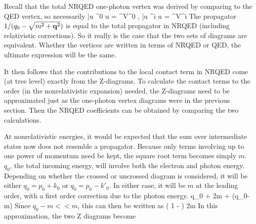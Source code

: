 Recall that the total NRQED one-photon vertex was derived by comparing to the QED vertex, so necessarily
\beq
	\bar{u} \Gamma^0 u = \phi^\dagger V^0 \phi , \;  \bar{u} \Gamma^i u = \phi^\dagger V^i \phi
\eeq 
The propagator $1/(q_0 - \sqrt{m^2 + \mathbf{q}^2})$ is equal to the total propagator in NRQED (including relativistic corrections).  So it really is the case that the two sets of diagrams are equivalent.  Whether the vertices are written in terms of NRQED or QED, the ultimate expression will be the same.

It then follows that the contributions to the local contact term in NRQED come (at tree level) exactly from the Z-diagrams.  To calculate the contact terms to the order (in the nonrelativistic expansion) needed, the Z-diagrams need to be approximated just as the one-photon vertex diagrams were in the previous section.  Then the NRQED coefficients can be obtained by comparing the two calculations.  

At nonrelativistic energies, it would be expected that the sum over intermediate states now does not resemble a propagator.  Because only terms involving up to one power of momentum need be kept, the square root term becomes simply $m$.  $q_0$, the total incoming energy, will involve both the electron and photon energy.  Depending on whether the crossed or uncrossed diagram is considered, it will be either $q_0 = p_0 + k_0$ or $q_0 = p_0 - k'_0$.  In either case, it will be $m$ at the leading order, with a first order correction due to the photon energy. 
\beq
	  {q_0 +  } 
		\approx {}  {2m + (q_0-m) }
\eeq
Since $q_0-m << m$, this can then be written as 
\beq
		\approx  \left( 1 -  \right )   {2m}
\eeq
In this approximation, the two Z diagrams become


